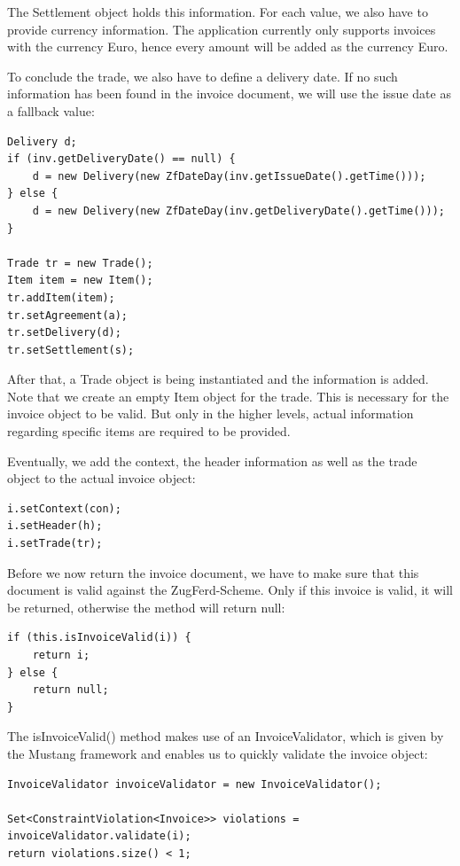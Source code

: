 The Settlement object holds this information. For each value, we also have to provide currency information. The application currently only supports invoices with the currency Euro, hence every amount will be added as the currency Euro.

To conclude the trade, we also have to define a delivery date. If no such information has been found in the invoice document, we will use the issue date as a fallback value:

\begin{lstlisting}[caption={Population of the trade object}]
Delivery d;
if (inv.getDeliveryDate() == null) {
    d = new Delivery(new ZfDateDay(inv.getIssueDate().getTime()));
} else {
    d = new Delivery(new ZfDateDay(inv.getDeliveryDate().getTime()));
}

Trade tr = new Trade();
Item item = new Item();
tr.addItem(item);
tr.setAgreement(a);
tr.setDelivery(d);
tr.setSettlement(s);
\end{lstlisting}

After that, a Trade object is being instantiated and the information is added. Note that we create an empty Item object for the trade. This is necessary for the invoice object to be valid. But only in the higher levels, actual information regarding specific items are required to be provided.

Eventually, we add the context, the header information as well as the trade object to the actual invoice object:

\begin{lstlisting}[caption={Population of the invoice object}]
i.setContext(con);
i.setHeader(h);
i.setTrade(tr);
\end{lstlisting}

Before we now return the invoice document, we have to make sure that this document is valid against the ZugFerd-Scheme. Only if this invoice is valid, it will be returned, otherwise the method will return null:

\begin{lstlisting}[caption={Validation of the invoice object}]
if (this.isInvoiceValid(i)) {
    return i;
} else {
    return null;
}
\end{lstlisting}

The isInvoiceValid() method makes use of an InvoiceValidator, which is given by the Mustang framework and enables us to quickly validate the invoice object:

\begin{lstlisting}[caption={Usage of the InvoiceValidator object}]
InvoiceValidator invoiceValidator = new InvoiceValidator();

Set<ConstraintViolation<Invoice>> violations = invoiceValidator.validate(i);
return violations.size() < 1;
\end{lstlisting}

